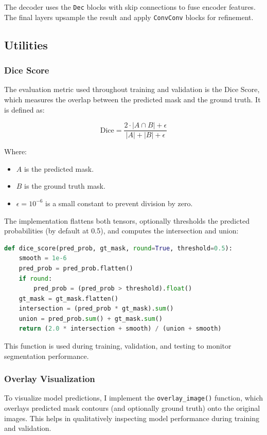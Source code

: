 \documentclass{homework}
\begin{document}
The decoder uses the \lstinline{Dec} blocks with skip connections to fuse encoder features. The final layers upsample the result and apply \lstinline{ConvConv} blocks for refinement.

\subsection{Utilities}

\subsubsection{Dice Score}

The evaluation metric used throughout training and validation is the Dice Score, which measures the overlap between the predicted mask and the ground truth. It is defined as:

\[
\text{Dice} = \frac{2 \cdot |A \cap B| + \epsilon}{|A| + |B| + \epsilon}
\]

Where:
\begin{itemize}
    \item \( A \) is the predicted mask.
    \item \( B \) is the ground truth mask.
    \item \( \epsilon = 10^{-6} \) is a small constant to prevent division by zero.
\end{itemize}

The implementation flattens both tensors, optionally thresholds the predicted probabilities (by default at 0.5), and computes the intersection and union:

\begin{lstlisting}[language=Python]
def dice_score(pred_prob, gt_mask, round=True, threshold=0.5):
    smooth = 1e-6
    pred_prob = pred_prob.flatten()
    if round:
        pred_prob = (pred_prob > threshold).float()
    gt_mask = gt_mask.flatten()
    intersection = (pred_prob * gt_mask).sum()
    union = pred_prob.sum() + gt_mask.sum()
    return (2.0 * intersection + smooth) / (union + smooth)
\end{lstlisting}

This function is used during training, validation, and testing to monitor segmentation performance.

\subsubsection{Overlay Visualization}

To visualize model predictions, I implement the \lstinline{overlay_image()} function, which overlays predicted mask contours (and optionally ground truth) onto the original images. This helps in qualitatively inspecting model performance during training and validation.
\end{document}
